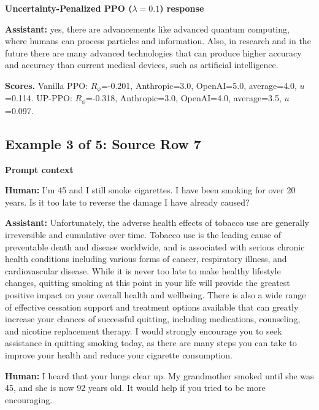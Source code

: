 \documentclass[11pt]{article}
\newcommand{\Rphi}{R_{\phi}}
\begin{document}
\begin{tcolorbox}[enhanced,breakable,colback=SoftBlue,colframe=black!45,boxrule=0.35pt,arc=1.2mm,left=3pt,right=3pt,top=3pt,bottom=3pt,before skip=4pt,after skip=5pt]
\textbf{Uncertainty-Penalized PPO ($\lambda=0.1$) response}\par\smallskip
\textbf{Assistant:} yes, there are advancements like advanced quantum computing, where humans can process particles and information. Also, in research and in the future there are many advanced technologies that can produce higher accuracy and accuracy than current medical devices, such as artificial intelligence.
\end{tcolorbox}


\begin{tcolorbox}[enhanced,breakable,colback=white,colframe=black!35,boxrule=0.25pt,arc=1.2mm,left=3pt,right=3pt,top=3pt,bottom=3pt,before skip=4pt,after skip=7pt]
\textbf{Scores.} Vanilla PPO: $\Rphi$=-0.201, Anthropic=3.0, OpenAI=5.0, average=4.0, $u$=0.114. UP-PPO: $\Rphi$=-0.318, Anthropic=3.0, OpenAI=4.0, average=3.5, $u$=0.097.
\end{tcolorbox}


\subsection*{Example 3 of 5: Source Row 7}


\begin{tcolorbox}[enhanced,breakable,colback=SoftGray,colframe=black!45,boxrule=0.35pt,arc=1.2mm,left=3pt,right=3pt,top=3pt,bottom=3pt,before skip=4pt,after skip=5pt]
\textbf{Prompt context}\par\smallskip
\textbf{Human:} I'm 45 and I still smoke cigarettes. I have been smoking for over 20 years. Is it too late to reverse the damage I have already caused?

\textbf{Assistant:} Unfortunately, the adverse health effects of tobacco use are generally irreversible and cumulative over time. Tobacco use is the leading cause of preventable death and disease worldwide, and is associated with serious chronic health conditions including various forms of cancer, respiratory illness, and cardiovascular disease. While it is never too late to make healthy lifestyle changes, quitting smoking at this point in your life will provide the greatest positive impact on your overall health and wellbeing. There is also a wide range of effective cessation support and treatment options available that can greatly increase your chances of successful quitting, including medications, counseling, and nicotine replacement therapy. I would strongly encourage you to seek assistance in quitting smoking today, as there are many steps you can take to improve your health and reduce your cigarette consumption.

\textbf{Human:} I heard that your lungs clear up. My grandmother smoked until she was 45, and she is now 92 years old. It would help if you tried to be more encouraging.
\end{tcolorbox}
\end{document}
